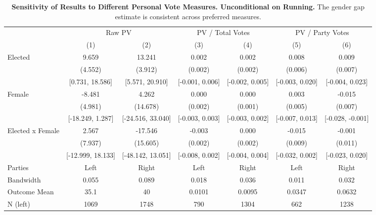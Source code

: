 \begin{table}[!h]

\caption{\label{tab:norway_pv_check_uncond} \textbf{Sensitivity of Results to Different Personal Vote Measures. Unconditional on Running.} The gender gap estimate is consistent across preferred measures.}
\centering
\fontsize{9}{11}\selectfont
\begin{threeparttable}
\begin{tabular}[t]{lcccccc}
\toprule
\multicolumn{1}{c}{ } & \multicolumn{2}{c}{Raw PV} & \multicolumn{2}{c}{PV / Total Votes} & \multicolumn{2}{c}{PV / Party Votes} \\
\cmidrule(l{3pt}r{3pt}){2-3} \cmidrule(l{3pt}r{3pt}){4-5} \cmidrule(l{3pt}r{3pt}){6-7}
  & \multicolumn{1}{c}{(1)} & \multicolumn{1}{c}{(2)} & \multicolumn{1}{c}{(3)} & \multicolumn{1}{c}{(4)} & \multicolumn{1}{c}{(5)} & \multicolumn{1}{c}{(6)}\\
\midrule
Elected & 9.659 & 13.241 & 0.002 & 0.002 & 0.008 & 0.009\\
 & (4.552) & (3.912) & (0.002) & (0.002) & (0.006) & (0.007)\\
 & {}[0.731, 18.586] & {}[5.571, 20.910] & {}[-0.001, 0.006] & {}[-0.002, 0.005] & {}[-0.003, 0.020] & {}[-0.004, 0.023]\\
\addlinespace
Female & -8.481 & 4.262 & 0.000 & 0.000 & 0.003 & -0.015\\
 & (4.981) & (14.678) & (0.002) & (0.001) & (0.005) & (0.007)\\
 & {}[-18.249, 1.287] & {}[-24.516, 33.040] & {}[-0.003, 0.003] & {}[-0.003, 0.002] & {}[-0.007, 0.013] & {}[-0.028, -0.001]\\
\addlinespace
Elected x Female & 2.567 & -17.546 & -0.003 & 0.000 & -0.015 & -0.001\\
 & (7.937) & (15.605) & (0.002) & (0.002) & (0.009) & (0.011)\\
 & {}[-12.999, 18.133] & {}[-48.142, 13.051] & {}[-0.008, 0.002] & {}[-0.004, 0.004] & {}[-0.032, 0.002] & {}[-0.023, 0.020]\\
\addlinespace \midrule \addlinespace
\addlinespace
Parties & \multicolumn{1}{c}{Left} & \multicolumn{1}{c}{Right} & \multicolumn{1}{c}{Left} & \multicolumn{1}{c}{Right} & \multicolumn{1}{c}{Left} & \multicolumn{1}{c}{Right}\\
Bandwidth & 0.055 & 0.089 & 0.018 & 0.036 & 0.011 & 0.032\\
Outcome Mean & 35.1 & 40 & 0.0101 & 0.0095 & 0.0347 & 0.0632\\
N (left) & \multicolumn{1}{c}{1069} & \multicolumn{1}{c}{1748} & \multicolumn{1}{c}{790} & \multicolumn{1}{c}{1304} & \multicolumn{1}{c}{662} & \multicolumn{1}{c}{1238}\\

\end{tabular}
\end{threeparttable}
\end{table}
